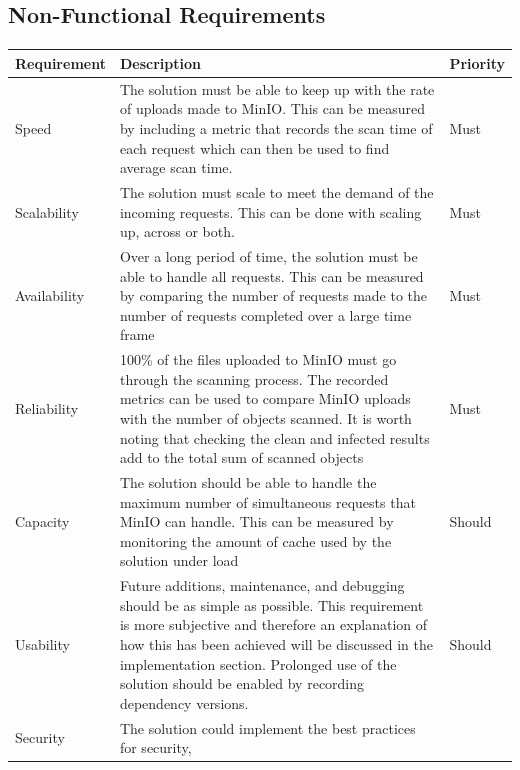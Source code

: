 \documentclass[12pt, conference, final, a4paper, onecolumn, compsoc]{IEEEtran}
\begin{document}
\subsection{Non-Functional Requirements}
\paragraph{}

\begin{table}[H]
  \centering
  \begin{tabular}{|l|p{}|l|}
    \hline
    \textbf{Requirement} & \textbf{Description} & \textbf{Priority} \\ \hline
    Speed & The solution must be able to keep up with the rate of uploads made
            to MinIO. This can be measured by including a metric that records
            the scan time of each request which can then be used to find average
            scan time. & Must \\ \hline
    Scalability & The solution must scale to meet the demand of the incoming
                  requests. This can be done with scaling up, across or both.  & Must \\ \hline
    Availability & Over a long period of time, the solution must be able to handle all requests. This can be measured by comparing the number of requests made to the number of requests completed over a large time frame & Must \\ \hline
    Reliability & 100\% of the files uploaded to MinIO must go through the scanning process. The recorded metrics can be used to compare MinIO uploads with the number of objects scanned. It is worth noting that checking the clean and infected results add to the total sum of scanned objects & Must \\ \hline
    Capacity & The solution should be able to handle the maximum number of simultaneous requests that MinIO can handle. This can be measured by monitoring the amount of cache used by the solution under load & Should \\ \hline
    Usability & Future additions, maintenance, and debugging should be as simple
                as possible. This requirement is more subjective and therefore
                an explanation of how this has been achieved will be discussed
                in the implementation section. Prolonged use of the solution
                should be enabled by recording dependency versions. & Should \\ \hline
    Security & The solution could implement the best practices for security,

\end{tabular}
\end{table}
\end{document}
